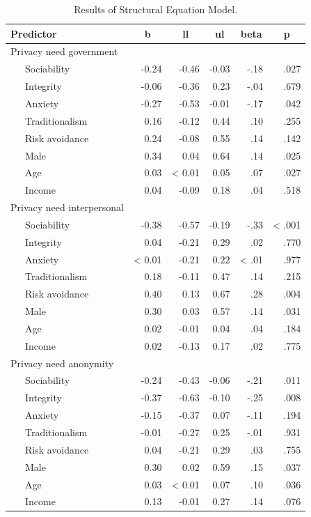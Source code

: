 \documentclass[man,floatsintext]{apa6}
\begin{document}
\begin{table}[tbp]
\begin{center}
\begin{threeparttable}
\caption{\label{tab:sem-tab}Results of Structural Equation Model.}
\footnotesize{
\begin{tabular}{lrrrrr}
\toprule
Predictor & \multicolumn{1}{c}{b} & \multicolumn{1}{c}{ll} & \multicolumn{1}{c}{ul} & \multicolumn{1}{c}{beta} & \multicolumn{1}{c}{p}\\
\midrule
Privacy need government &  &  &  &  & \\
\ \ \ Sociability & -0.24 & -0.46 & -0.03 & -.18 & .027\\
\ \ \ Integrity & -0.06 & -0.36 & 0.23 & -.04 & .679\\
\ \ \ Anxiety & -0.27 & -0.53 & -0.01 & -.17 & .042\\
\ \ \ Traditionalism & 0.16 & -0.12 & 0.44 & .10 & .255\\
\ \ \ Risk avoidance & 0.24 & -0.08 & 0.55 & .14 & .142\\
\ \ \ Male & 0.34 & 0.04 & 0.64 & .14 & .025\\
\ \ \ Age & 0.03 & < 0.01 & 0.05 & .07 & .027\\
\ \ \ Income & 0.04 & -0.09 & 0.18 & .04 & .518\\
Privacy need interpersonal &  &  &  &  & \\
\ \ \ Sociability & -0.38 & -0.57 & -0.19 & -.33 & < .001\\
\ \ \ Integrity & 0.04 & -0.21 & 0.29 & .02 & .770\\
\ \ \ Anxiety & < 0.01 & -0.21 & 0.22 & < .01 & .977\\
\ \ \ Traditionalism & 0.18 & -0.11 & 0.47 & .14 & .215\\
\ \ \ Risk avoidance & 0.40 & 0.13 & 0.67 & .28 & .004\\
\ \ \ Male & 0.30 & 0.03 & 0.57 & .14 & .031\\
\ \ \ Age & 0.02 & -0.01 & 0.04 & .04 & .184\\
\ \ \ Income & 0.02 & -0.13 & 0.17 & .02 & .775\\
Privacy need anonymity &  &  &  &  & \\
\ \ \ Sociability & -0.24 & -0.43 & -0.06 & -.21 & .011\\
\ \ \ Integrity & -0.37 & -0.63 & -0.10 & -.25 & .008\\
\ \ \ Anxiety & -0.15 & -0.37 & 0.07 & -.11 & .194\\
\ \ \ Traditionalism & -0.01 & -0.27 & 0.25 & -.01 & .931\\
\ \ \ Risk avoidance & 0.04 & -0.21 & 0.29 & .03 & .755\\
\ \ \ Male & 0.30 & 0.02 & 0.59 & .15 & .037\\
\ \ \ Age & 0.03 & < 0.01 & 0.07 & .10 & .036\\
\ \ \ Income & 0.13 & -0.01 & 0.27 & .14 & .076\\
\bottomrule
\end{tabular}
}
\end{threeparttable}
\end{center}
\end{table}
\end{document}

